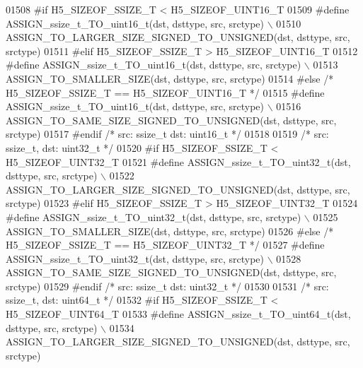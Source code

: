 \begin{DoxyCode}
01508 \textcolor{preprocessor}{#if H5\_SIZEOF\_SSIZE\_T < H5\_SIZEOF\_UINT16\_T}
01509 \textcolor{preprocessor}{    #define ASSIGN\_ssize\_t\_TO\_uint16\_t(dst, dsttype, src, srctype) \(\backslash\)}
01510 \textcolor{preprocessor}{        ASSIGN\_TO\_LARGER\_SIZE\_SIGNED\_TO\_UNSIGNED(dst, dsttype, src, srctype)}
01511 \textcolor{preprocessor}{#elif H5\_SIZEOF\_SSIZE\_T > H5\_SIZEOF\_UINT16\_T}
01512 \textcolor{preprocessor}{    #define ASSIGN\_ssize\_t\_TO\_uint16\_t(dst, dsttype, src, srctype) \(\backslash\)}
01513 \textcolor{preprocessor}{        ASSIGN\_TO\_SMALLER\_SIZE(dst, dsttype, src, srctype)}
01514 \textcolor{preprocessor}{#else }\textcolor{comment}{/* H5\_SIZEOF\_SSIZE\_T == H5\_SIZEOF\_UINT16\_T */}\textcolor{preprocessor}{}
01515 \textcolor{preprocessor}{    #define ASSIGN\_ssize\_t\_TO\_uint16\_t(dst, dsttype, src, srctype) \(\backslash\)}
01516 \textcolor{preprocessor}{        ASSIGN\_TO\_SAME\_SIZE\_SIGNED\_TO\_UNSIGNED(dst, dsttype, src, srctype)}
01517 \textcolor{preprocessor}{#endif }\textcolor{comment}{/* src: ssize\_t dst: uint16\_t */}\textcolor{preprocessor}{}
01518 
01519 \textcolor{comment}{/* src: ssize\_t, dst: uint32\_t */}
01520 \textcolor{preprocessor}{#if H5\_SIZEOF\_SSIZE\_T < H5\_SIZEOF\_UINT32\_T}
01521 \textcolor{preprocessor}{    #define ASSIGN\_ssize\_t\_TO\_uint32\_t(dst, dsttype, src, srctype) \(\backslash\)}
01522 \textcolor{preprocessor}{        ASSIGN\_TO\_LARGER\_SIZE\_SIGNED\_TO\_UNSIGNED(dst, dsttype, src, srctype)}
01523 \textcolor{preprocessor}{#elif H5\_SIZEOF\_SSIZE\_T > H5\_SIZEOF\_UINT32\_T}
01524 \textcolor{preprocessor}{    #define ASSIGN\_ssize\_t\_TO\_uint32\_t(dst, dsttype, src, srctype) \(\backslash\)}
01525 \textcolor{preprocessor}{        ASSIGN\_TO\_SMALLER\_SIZE(dst, dsttype, src, srctype)}
01526 \textcolor{preprocessor}{#else }\textcolor{comment}{/* H5\_SIZEOF\_SSIZE\_T == H5\_SIZEOF\_UINT32\_T */}\textcolor{preprocessor}{}
01527 \textcolor{preprocessor}{    #define ASSIGN\_ssize\_t\_TO\_uint32\_t(dst, dsttype, src, srctype) \(\backslash\)}
01528 \textcolor{preprocessor}{        ASSIGN\_TO\_SAME\_SIZE\_SIGNED\_TO\_UNSIGNED(dst, dsttype, src, srctype)}
01529 \textcolor{preprocessor}{#endif }\textcolor{comment}{/* src: ssize\_t dst: uint32\_t */}\textcolor{preprocessor}{}
01530 
01531 \textcolor{comment}{/* src: ssize\_t, dst: uint64\_t */}
01532 \textcolor{preprocessor}{#if H5\_SIZEOF\_SSIZE\_T < H5\_SIZEOF\_UINT64\_T}
01533 \textcolor{preprocessor}{    #define ASSIGN\_ssize\_t\_TO\_uint64\_t(dst, dsttype, src, srctype) \(\backslash\)}
01534 \textcolor{preprocessor}{        ASSIGN\_TO\_LARGER\_SIZE\_SIGNED\_TO\_UNSIGNED(dst, dsttype, src, srctype)}

\end{DoxyCode}
